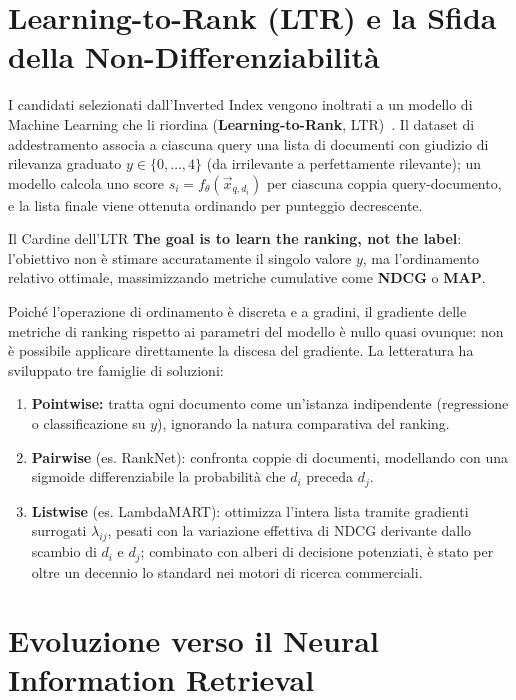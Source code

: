 \FloatBarrier
\section{Learning-to-Rank (LTR) e la Sfida della Non-Differenziabilit\`a}

I candidati selezionati dall'Inverted Index vengono inoltrati a un modello di Machine Learning che li riordina (\textbf{Learning-to-Rank}, LTR)~\cite{burges2010}. Il dataset di addestramento associa a ciascuna query una lista di documenti con giudizio di rilevanza graduato $y \in \{0,\dots,4\}$ (da irrilevante a perfettamente rilevante); un modello calcola uno score $s_i = f_\theta(\vec{x}_{q,d_i})$ per ciascuna coppia query-documento, e la lista finale viene ottenuta ordinando per punteggio decrescente.

\begin{alertblock}{Il Cardine dell'LTR}
\textbf{The goal is to learn the ranking, not the label}: l'obiettivo non \`e stimare accuratamente il singolo valore $y$, ma l'ordinamento relativo ottimale, massimizzando metriche cumulative come \textbf{NDCG} o \textbf{MAP}.
\end{alertblock}

Poich\'e l'operazione di ordinamento \`e discreta e a gradini, il gradiente delle metriche di ranking rispetto ai parametri del modello \`e nullo quasi ovunque: non \`e possibile applicare direttamente la discesa del gradiente. La letteratura ha sviluppato tre famiglie di soluzioni:
\begin{enumerate}
    \item \textbf{Pointwise:} tratta ogni documento come un'istanza indipendente (regressione o classificazione su $y$), ignorando la natura comparativa del ranking.
    \item \textbf{Pairwise} (es. RankNet): confronta coppie di documenti, modellando con una sigmoide differenziabile la probabilit\`a che $d_i$ preceda $d_j$.
    \item \textbf{Listwise} (es. LambdaMART): ottimizza l'intera lista tramite gradienti surrogati $\lambda_{ij}$, pesati con la variazione effettiva di NDCG derivante dallo scambio di $d_i$ e $d_j$; combinato con alberi di decisione potenziati, \`e stato per oltre un decennio lo standard nei motori di ricerca commerciali.
\end{enumerate}

\FloatBarrier
\section{Evoluzione verso il Neural Information Retrieval}

